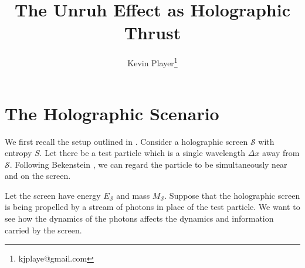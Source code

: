 \documentclass[12pt,a4paper]{article}
\begin{document}
\title{The Unruh Effect as Holographic Thrust}
\author[1]{Kevin Player\footnote{kjplaye@gmail.com}}

\maketitle


\section{The Holographic Scenario}
We first recall the setup outlined in \cite{entropic}. Consider a holographic screen $\mathscr{S}$ with entropy $S$.  Let there be a test particle which is a single wavelength $\Delta x$ away from $\mathscr{S}$.  Following Bekenstein \cite{bekenstein}, we can regard the particle to be simultaneously near and on the screen.

Let the screen have energy $E_\mathscr{S}$ and mass $M_\mathscr{S}$.  Suppose that the holographic screen is being propelled by a stream of photons in place of the test particle.  We want to see how the dynamics of the photons affects the dynamics and information carried by the screen.
\end{document}
